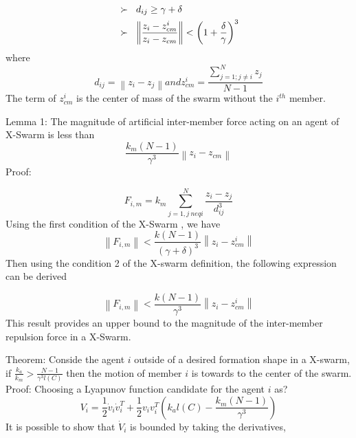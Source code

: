 \documentclass[twoside]{article}
\newcommand{\norm}[1]{\left\lVert#1\right\rVert}
\begin{document}
\begin{align*}
&\succ\hspace{0.2cm}  d_{ij} \geq \gamma + \delta \\
&\succ \hspace{0.2cm}   \norm{\frac{z_i - z_{cm}^i}{z_i - z_{cm}}} < \left(1+\frac{\delta}{\gamma}\right)^3
\end{align*}
			where
\begin{equation}
 d_{ij} = \norm{z_i - z_j} and z_{cm}^i = \frac{\sum_{j=1; j\neq i}^{N} z_j}{N-1}
\end{equation}
The term of $z_{cm}^i$ is the center of mass of the swarm without the $i^{th}$ member.

Lemma 1: The magnitude of artificial inter-member force acting on an agent of X-Swarm  is less than
\begin{equation}
 \frac{k_m(N-1)}{\gamma ^3} \norm{z_i - z_{cm}}
\end{equation}
Proof:

\begin{equation}
 F_{i,m} = k_m \sum_{j=1, j\ neq i}^{N} \frac{z_i - z_j}{d_{ij}^3} 
\end{equation}
Using the first condition of the X-Swarm , we have
\begin{equation}
 \norm{F_{i,m}} < \frac{k(N-1)}{(\gamma + \delta)^3} \norm{z_i - z_{cm}^i}
\end{equation}
Then using the condition 2 of the X-swarm definition, the following expression can be derived

\begin{equation}
 \norm{F_{i,m}} < \frac{k(N-1)}{\gamma^3} \norm{z_i - z_{cm}^i}
\end{equation}
		This result provides an upper bound to the magnitude of the inter-member repulsion force in a X-Swarm.  
		
		Theorem: Conside the agent $i$	outside of a desired formation shape in a X-swarm, if $\frac{k_a}{k_m} > \frac{N-1}{\gamma^3  l(C)}$ then the motion of member $i$ is towards to the center of the swarm. 
		Proof: Choosing a Lyapunov function candidate for the agent $i$ as?
		\begin{equation}
      V_i = \frac{1}{2} \dot{v}_i \dot{v}_i^T + \frac{1}{2} v_i v_i^T\left(k_al(C)-\frac{k_m(N-1)}{\gamma^3}\right) 
      		\end{equation}
			It is possible to show that $\dot{V}_i$ is bounded by taking the derivatives,
			
\end{document}
